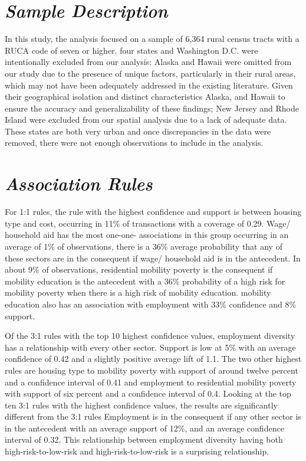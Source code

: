 
\section{\textit{Sample Description}}

In this study, the analysis focused on a sample of 6,364 rural census tracts with a RUCA code of seven or higher. four states and Washington D.C. were intentionally excluded from our analysis: Alaska and Hawaii were omitted from our study due to the presence of unique factors, particularly in their rural areas, which may not have been adequately addressed in the existing literature. Given their geographical isolation and distinct characteristics Alaska, and Hawaii to ensure the accuracy and generalizability of these findings; New Jersey and Rhode Island were excluded from our spatial analysis due to a lack of adequate data. These states are both very urban and once discrepancies in the data were removed, there were not enough observations to include in the analysis.  

\section{\textit{Association Rules}}
For 1:1 rules, the rule with the highest confidence and support is between housing type and cost, occurring in 11\% of transactions with a coverage of 0.29. Wage/ household aid has the most one-one- associations in this group occurring in an average of 1\% of observations, there is a 36\% average probability that any of these sectors are in the consequent if wage/ household aid is in the antecedent. In about 9\% of observations, residential mobility poverty is the consequent if mobility education is the antecedent with a 36\% probability of a high risk for mobility poverty when there is a high risk of mobility education. mobility education also has an association with employment with 33\% confidence and 8\% support. 

Of the 3:1 rules with the top 10 highest confidence values, employment diversity has a relationship with every other sector. Support is low at 5\% with an average confidence of 0.42 and a slightly positive average lift of 1.1. The two other highest rules are housing type to mobility poverty with support of around twelve percent and a confidence interval of 0.41 and employment to residential mobility poverty with support of six percent and a confidence interval of 0.4. Looking at the top ten 3:1 rules with the highest confidence values, the results are significantly different from the 3:1 rules Employment is in the consequent if any other sector is in the antecedent with an average support of 12\%, and an average confidence interval of 0.32. This relationship between employment diversity having both high-risk-to-low-risk and high-risk-to-low-risk is a surprising relationship. 

